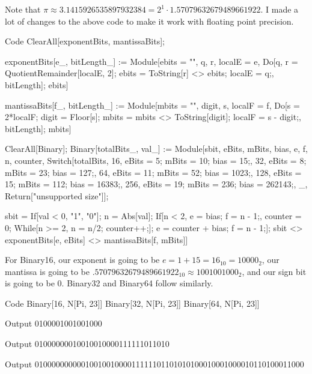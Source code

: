 \documentclass[11pt,twoside,openany]{memoir}
\begin{document}
        \begin{solution}
            Note that $\pi \approx 3.1415926535897932384 = 2^1 \cdot 1.57079632679489661922$. I made a lot of changes to the above code to make it work with floating point precision.
\begin{mmaCell}[functionlocal=y]{Code}
ClearAll[exponentBits, mantissaBits];

exponentBits[e_, bitLength_] := 
 Module[{ebits = "", q, r, localE = e},
  Do[{q, r} = QuotientRemainder[localE, 2];
   ebits = ToString[r] <> ebits;
   localE = q;, {bitLength}];
  ebits]
   
mantissaBits[f_, bitLength_] := 
 Module[{mbits = "", digit, s, localF = f},
  Do[s = 2*localF;
   digit = Floor[s];
   mbits = mbits <> ToString[digit];
   localF = s - digit;, {bitLength}];
  mbits]
   
ClearAll[Binary];
Binary[totalBits_, val_] := 
 Module[{sbit, eBits, mBits, bias, e, f, n, counter},
  Switch[totalBits,
   16, {eBits = 5; mBits = 10; bias = 15;},
   32, {eBits = 8; mBits = 23; bias = 127;},
   64, {eBits = 11; mBits = 52; bias = 1023;},
   128, {eBits = 15; mBits = 112; bias = 16383;},
   256, {eBits = 19; mBits = 236; bias = 262143;},
   _, Return["unsupported size"]];
   
  sbit = If[val < 0, "1", "0"]; 
  n = Abs[val];
  If[n < 2, e = bias;
   f = n - 1;,
   counter = 0;
   While[n >= 2, n = n/2;
    counter++;];
   e = counter + bias;
   f = n - 1;];
  sbit <> exponentBits[e, eBits] <> mantissaBits[f, mBits]]
\end{mmaCell}




            For Binary16, our exponent is going to be $e = 1 + 15 = 16_{10} = 10000_{2}$, our mantissa is going to be $.57079632679489661922_{10} \approx 1001001000_2$, and our sign bit is going to be $0$. Binary32 and Binary64 follow similarly.
\begin{mmaCell}[functionlocal=y]{Code}
Binary[16, N[Pi, 23]]
Binary[32, N[Pi, 23]]
Binary[64, N[Pi, 23]]
\end{mmaCell}

\begin{mmaCell}{Output}
0100001001001000
\end{mmaCell}
\begin{mmaCell}{Output}
01000000010010010000111111011010
\end{mmaCell}
\begin{mmaCell}{Output}
0100000000001001001000011111101101010100010001000010110100011000
\end{mmaCell}


\end{solution}
\end{document}
